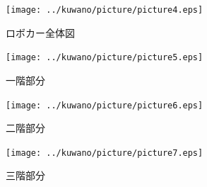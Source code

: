 \begin{figure}[hb]
 \begin{center}
  \texttt{[image: ../kuwano/picture/picture4.eps]}
  \caption{ロボカー全体図}
  \label{fig:robocar}
 \end{center}
\end{figure}

\begin{figure}[hb]
 \begin{center}
  \texttt{[image: ../kuwano/picture/picture5.eps]}
  \caption{一階部分}
  \label{fig:1F}
 \end{center}
\end{figure}

\begin{figure}[hb]
 \begin{center}
  \texttt{[image: ../kuwano/picture/picture6.eps]}
  \caption{二階部分}
  \label{fig:2F}
 \end{center}
\end{figure}

\begin{figure}[hb]
 \begin{center}
  \texttt{[image: ../kuwano/picture/picture7.eps]}
  \caption{三階部分}
  \label{fig:3F}
 \end{center}
\end{figure}
